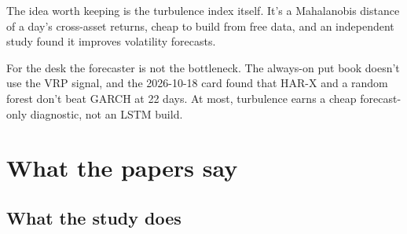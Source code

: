 \documentclass{article}
\begin{document}
The idea worth keeping is the turbulence index itself. It's a Mahalanobis distance of a day's cross-asset returns, cheap to build from free data, and an independent study found it improves volatility forecasts.

For the desk the forecaster is not the bottleneck. The always-on put book doesn't use the VRP signal, and the 2026-10-18 card found that HAR-X and a random forest don't beat GARCH at 22 days. At most, turbulence earns a cheap forecast-only diagnostic, not an LSTM build.

\section{What the papers say}

\subsection{What the study does}
\end{document}
